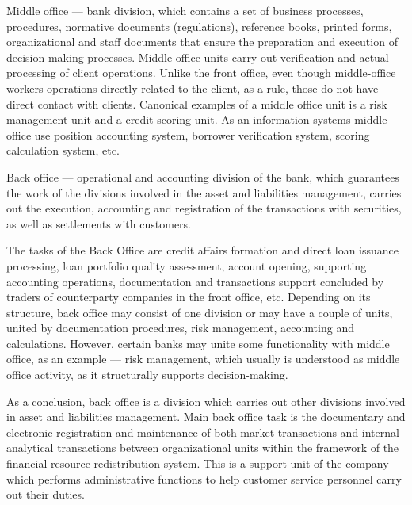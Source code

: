 Middle office — bank division, which contains a set of business processes, procedures, normative documents (regulations), reference books, printed forms, organizational and staff documents that ensure the preparation and execution of decision-making processes.
Middle office units carry out verification and actual processing of client operations. Unlike the front office, even though middle-office workers operations directly related to the client, as a rule, those do not have direct contact with clients.
Canonical examples of a middle office unit is a risk management unit and a credit scoring unit.
As an information systems middle-office use position accounting system, borrower verification system, scoring calculation system, etc.

Back office — operational and accounting division of the bank, which guarantees the work of the divisions involved in the  asset and liabilities management, carries out the execution, accounting and registration of the transactions with securities, as well as settlements with customers. 

The tasks of the Back Office are credit affairs formation and direct loan issuance processing, loan portfolio quality assessment, account opening, supporting accounting operations, documentation and transactions support concluded by traders of counterparty companies in the front office, etc. 
Depending on its structure, back office may consist of one division or may have a couple of units, united by documentation procedures, risk management, accounting and calculations. However, certain banks may unite some functionality with middle office, as an example — risk management, which usually is understood as middle office activity, as it structurally supports decision-making.

As a conclusion, back office is a division which carries out other divisions involved in asset and liabilities management. 
Main back office task is the documentary and electronic registration and maintenance of both market transactions and internal analytical transactions between organizational units within the framework of the financial resource redistribution system. This is a support unit of the company which performs administrative functions to help customer service personnel carry out their duties.
